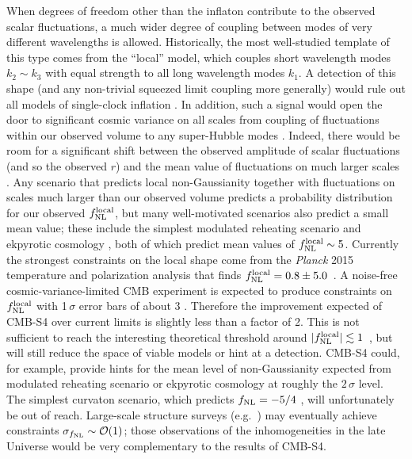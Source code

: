 When degrees of freedom other than the inflaton contribute to the observed scalar fluctuations, a much wider degree of coupling between modes of very different wavelengths is allowed. Historically, the most well-studied template of this type comes from the ``local'' model, which couples short wavelength modes $k_2\sim k_3$ with equal strength to all long wavelength modes $k_1$. A detection of this shape (and any non-trivial squeezed limit coupling more generally) would rule out all models of single-clock inflation \cite{Creminelli:2004yq}. In addition, such a signal would open the door to significant cosmic variance on all scales from coupling of fluctuations within our observed volume to any super-Hubble modes \cite{Nelson:2012sb,LoVerde:2013xka,Nurmi:2013xv}. Indeed, there would be room for a significant shift between the observed amplitude of scalar fluctuations (and so the observed $r$) and the mean value of fluctuations on much larger scales \cite{Bonga:2015urq}. Any scenario that predicts local non-Gaussianity together with fluctuations on scales much larger than our observed volume predicts a probability distribution for our observed $f_{\rm NL}^{\rm local}$, but many well-motivated scenarios also predict a small mean value; these include the simplest modulated reheating scenario \cite{Zaldarriaga:2003my} and ekpyrotic cosmology \cite{Lehners:2009ja}, both of which predict mean values of $f_{\rm NL}^{\rm local}\sim5$. 
Currently the strongest constraints on the local shape come from the {\it Planck\/} 2015 temperature and polarization analysis that finds $f_{\rm NL}^{\rm local} = 0.8 \pm 5.0$~\cite{Ade:2015ava}. A noise-free cosmic-variance-limited CMB experiment is expected to produce constraints on $f_{\rm NL}^{\rm local}$ with 1$\,\sigma$ error bars of about 3 \cite{Komatsu:2001rj}. Therefore the improvement expected of CMB-S4 over current limits is slightly less than a factor of 2. This is not sufficient to reach the interesting theoretical threshold around $|f_{\rm NL}^{\rm local}|\lesssim 1$~\cite{Alvarez:2014vva}, but will still reduce the space of viable models or hint at a detection. CMB-S4 could, for example, provide hints for the mean level of non-Gaussianity expected from modulated reheating scenario or ekpyrotic cosmology at roughly the $2\,\sigma$ level. The simplest curvaton scenario, which predicts $f_{\rm NL} = -5/4$ \cite{Lyth:2001nq}, will unfortunately be out of reach. Large-scale structure surveys (e.g.\ \cite{Dore:2014cca}) may eventually achieve constraints $\sigma_{f_{\rm NL}}\sim\mathcal{O}(1)$; those observations of the inhomogeneities in the late Universe would be very complementary to the results of CMB-S4.


